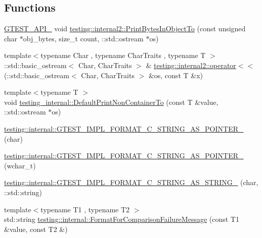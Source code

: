 \subsection*{Functions}
\begin{DoxyCompactItemize}
\item 
\hyperlink{gtest-port_8h_aa73be6f0ba4a7456180a94904ce17790}{G\+T\+E\+S\+T\+\_\+\+A\+P\+I\+\_\+} void \hyperlink{namespacetesting_1_1internal2_a9fbf8e07c0f94dc74d6ef5e56cd3c553}{testing\+::internal2\+::\+Print\+Bytes\+In\+Object\+To} (const unsigned char $\ast$obj\+\_\+bytes, size\+\_\+t count, \+::std\+::ostream $\ast$os)
\item 
{\footnotesize template$<$typename Char , typename Char\+Traits , typename T $>$ }\\\+::std\+::basic\+\_\+ostream$<$ Char, Char\+Traits $>$ \& \hyperlink{namespacetesting_1_1internal2_a07dbe129beb8952074f04b599dfce39b}{testing\+::internal2\+::operator$<$$<$} (\+::std\+::basic\+\_\+ostream$<$ Char, Char\+Traits $>$ \&os, const T \&x)
\item 
{\footnotesize template$<$typename T $>$ }\\void \hyperlink{namespacetesting__internal_a3f49d3d0c996242f9d383c850097a656}{testing\+\_\+internal\+::\+Default\+Print\+Non\+Container\+To} (const T \&value, \+::std\+::ostream $\ast$os)
\item 
\hyperlink{namespacetesting_1_1internal_a3682f962ae0ec1c0eca6444ca0a09e91}{testing\+::internal\+::\+G\+T\+E\+S\+T\+\_\+\+I\+M\+P\+L\+\_\+\+F\+O\+R\+M\+A\+T\+\_\+\+C\+\_\+\+S\+T\+R\+I\+N\+G\+\_\+\+A\+S\+\_\+\+P\+O\+I\+N\+T\+E\+R\+\_\+} (char)
\item 
\hyperlink{namespacetesting_1_1internal_a85e08f00d443221e529a0a85a90fbaeb}{testing\+::internal\+::\+G\+T\+E\+S\+T\+\_\+\+I\+M\+P\+L\+\_\+\+F\+O\+R\+M\+A\+T\+\_\+\+C\+\_\+\+S\+T\+R\+I\+N\+G\+\_\+\+A\+S\+\_\+\+P\+O\+I\+N\+T\+E\+R\+\_\+} (wchar\+\_\+t)
\item 
\hyperlink{namespacetesting_1_1internal_aeac30230dcc362221bdd07d61eaa4ec1}{testing\+::internal\+::\+G\+T\+E\+S\+T\+\_\+\+I\+M\+P\+L\+\_\+\+F\+O\+R\+M\+A\+T\+\_\+\+C\+\_\+\+S\+T\+R\+I\+N\+G\+\_\+\+A\+S\+\_\+\+S\+T\+R\+I\+N\+G\+\_\+} (char, \+::std\+::string)
\item 
{\footnotesize template$<$typename T1 , typename T2 $>$ }\\std\+::string \hyperlink{namespacetesting_1_1internal_a91ab078f10adc669f09b7f604975c518}{testing\+::internal\+::\+Format\+For\+Comparison\+Failure\+Message} (const T1 \&value, const T2 \&)
\item 

\end{DoxyCompactItemize}
